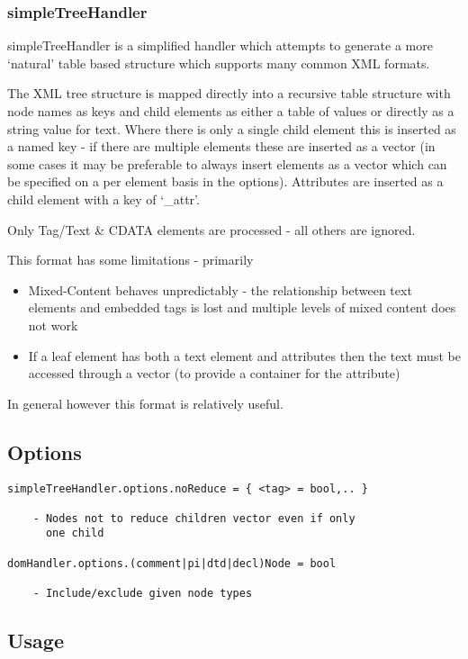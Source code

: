 \documentclass{ltxdoc}
\begin{document}
\subsubsection{simpleTreeHandler}

simpleTreeHandler is a simplified handler which attempts to generate a
more `natural' table based structure which supports many common XML
formats.

The XML tree structure is mapped directly into a recursive table
structure with node names as keys and child elements as either a table
of values or directly as a string value for text. Where there is only a
single child element this is inserted as a named key - if there are
multiple elements these are inserted as a vector (in some cases it may
be preferable to always insert elements as a vector which can be
specified on a per element basis in the options). Attributes are
inserted as a child element with a key of `\_attr'.

Only Tag/Text \& CDATA elements are processed - all others are ignored.

This format has some limitations - primarily

\begin{itemize}
\item  Mixed-Content behaves unpredictably - the relationship between text
  elements and embedded tags is lost and multiple levels of mixed
  content does not work
\item  If a leaf element has both a text element and attributes then the text
  must be accessed through a vector (to provide a container for the
  attribute)
\end{itemize}
In general however this format is relatively useful.


\subsection{Options}

\begin{verbatim}
simpleTreeHandler.options.noReduce = { <tag> = bool,.. }

    - Nodes not to reduce children vector even if only 
      one child

domHandler.options.(comment|pi|dtd|decl)Node = bool 

    - Include/exclude given node types
\end{verbatim}
\subsection{Usage}
\end{document}
